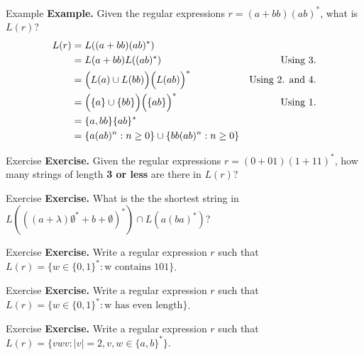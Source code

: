 \documentclass[10pt]{beamer}
\begin{document}
\begin{frame}{Example}
    \textbf{Example.} Given the regular expressions $r = (a+bb)(ab)^*$, what is $L(r)$?
    \begin{align*}
        L(r) & = L((a+bb)(ab)^*)                                                                    \\
             & = L(a + bb) L((ab)^*)                                       & \text{Using 3.}        \\
             & = \Big{(} L(a) \cup L(bb)\Big{)} \Big{(} L(ab)\Big{)}^*     & \text{Using 2. and 4.} \\
             & = \Big{(} \{a\} \cup \{bb\}\Big{)} \Big{(} \{ab\} \Big{)}^* & \text{Using 1.}        \\
             & = \{a, bb\} \{ab\}^*                                                                 \\
             & = \{a(ab)^n: n \geq 0\} \cup \{bb(ab)^n : n \geq 0\}
    \end{align*}
\end{frame}

\begin{frame}[t]{Exercise}
    \textbf{Exercise.} Given the regular expressions $r = (0+01)(1+11)^*$, how many strings of length \textbf{3 or less} are there in $L(r)$?

\end{frame}

\begin{frame}[t]{Exercise}
    \textbf{Exercise.} What is the the shortest string in $L(((a+\lambda)\emptyset^* + b + \emptyset)^*) \cap L(a(ba)^*)$?
\end{frame}

\begin{frame}[t]{Exercise}
    \textbf{Exercise.} Write a regular expression $r$ such that $L(r) = \{w \in \{0,1\}^* : \text{w contains 101}\}$.
\end{frame}

\begin{frame}[t]{Exercise}
    \textbf{Exercise.} Write a regular expression $r$ such that $L(r) = \{w \in \{0,1\}^* : \text{w has even length}\}$.
\end{frame}

\begin{frame}[t]{Exercise}
    \textbf{Exercise.} Write a regular expression $r$ such that $L(r) = \{vwv: |v| = 2, v,w \in \{a,b\}^*\}$.
\end{frame}
\end{document}
